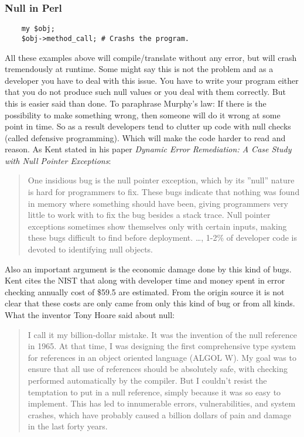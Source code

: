 \documentclass[a4paper,12pt]{report}
\begin{document}
\subsubsection{Null in Perl}
\begin{verbatim}
    my $obj;
    $obj->method_call; # Crashs the program.    
\end{verbatim}

All these examples above will compile/translate without any error, but will crash tremendously at runtime. Some might say this is not the problem and as a developer you have to deal with this issue. You have to write your program either that you do not produce such null values or you deal with them correctly. But this is easier said than done. To paraphrase Murphy's law\cite{murphys-law}: If there is the possibility to make something wrong, then someone will do it wrong at some point in time. So as a result developers tend to clutter up code with null checks (called defensive programming). Which will make the code harder to read and reason. As Kent\cite{kent-dyn-err-remediation} stated in his paper \textit{Dynamic Error Remediation: A Case Study with Null Pointer Exceptions}:

\begin{quotation}
    One insidious bug is the null pointer exception, which by its ”null” nature is hard for programmers to fix. These bugs indicate that nothing was found in memory where something should have been, giving programmers very little to work with to fix the bug besides a stack trace. Null pointer exceptions sometimes show themselves only with certain inputs, making these bugs difficult to find before deployment. \ldots, 1-2\% of developer code is devoted to identifying null objects.
\end{quotation}

Also an important argument is the economic damage done by this kind of bugs. Kent\cite{kent-dyn-err-remediation} cites the NIST that along with developer time and money spent in error checking annually cost of \$59.5 are estimated. From the origin source it is not clear that these costs are only came from only this kind of bug or from all kinds. What the inventor Tony Hoare\cite{hoare-wiki} said about null\cite{hoeare-null}:

\begin{quotation}
I call it my billion-dollar mistake. It was the invention of the null reference in 1965. At that time, I was designing the first comprehensive type system for references in an object oriented language (ALGOL W). My goal was to ensure that all use of references should be absolutely safe, with checking performed automatically by the compiler. But I couldn't resist the temptation to put in a null reference, simply because it was so easy to implement. This has led to innumerable errors, vulnerabilities, and system crashes, which have probably caused a billion dollars of pain and damage in the last forty years.	
\end{quotation} 
\end{document}
